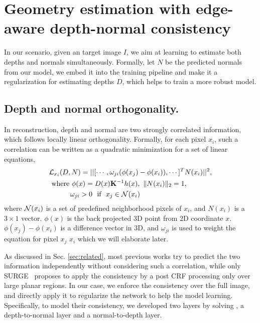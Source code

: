 \vspace{-0.7\baselineskip}
\section{Geometry estimation with edge-aware depth-normal consistency}
\label{sec:approach}
\vspace{-0.3\baselineskip}

In our scenario, given an target image $I$, we aim at learning to estimate both depths and normals simultaneously. Formally, let $N$ be the predicted normals from our model, we embed it into the training pipeline and make it a regularization for estimating depths $D$, which helps to train a more robust model.

\vspace{-0.5\baselineskip}
\subsection{Depth and normal orthogonality.}
\label{sub:depth_and_normal_orthogonality}
\vspace{-0.3\baselineskip}

In reconstruction, depth and normal are two strongly correlated information, which follows locally linear orthogonality. Formally, for each pixel $x_i$, such a correlation can be written as a quadratic minimization for a set of linear equations,
\begin{align}
\label{eq:orthognal}
&{\mathcal L}_{x_i}(D, N) = ||[\cdots,\omega_{ji}(\phi(x_j) - \phi(x_i)), \cdots]^T  N(x_i)||^2, \nonumber \\
&~\text{where~} \phi(x) = D(x){\mathbf K}^{-1}h(x), \text{~} \|N(x_i)\|_2 = 1, \nonumber\\
&~\text{~~~~~~~~} \omega_{ji} > 0 \text{~~if~~} x_j \in {\mathcal N}(x_i)
\end{align}
where ${\mathcal N}(x_i)$ is a set of predefined neighborhood pixels of $x_i$, and $N(x_i)$ is a $3 \times 1$ vector. $\phi(x)$ is the back projected 3D point from 2D coordinate $x$. $\phi(x_j) - \phi(x_i)$ is a difference vector in 3D, and $\omega_{ji}$ is used to weight the equation for pixel $x_j$ \wrt $x_i$ which we will elaborate later.

As discussed in Sec. \ref{sec:related}, most previous works try to predict the two information independently without considering such a correlation, while only SURGE~\cite{peng2016depth} proposes to apply the consistency by a post CRF processing only over large planar regions. In our case, we enforce the consistency over the full image, and directly apply it to regularize the network to help the model learning. Specifically, to model their consistency, we developed two layers by solving , \ie a depth-to-normal layer and a normal-to-depth layer. 

